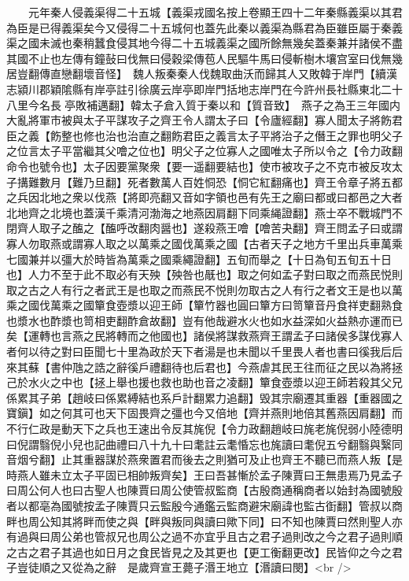 　　元年秦人侵義渠得二十五城【義渠戎國名按上卷顯王四十二年秦縣義渠以其君為臣是已得義渠矣今又侵得二十五城何也蓋先此秦以義渠為縣君為臣雖臣屬于秦義渠之國未滅也秦稍蠶食侵其地今得二十五城義渠之國所餘無幾矣蓋秦兼并諸侯不盡其國不止也左傳有鐘鼔曰伐無曰侵穀梁傳苞人民驅牛馬曰侵斬樹木壤宫室曰伐無幾居豈翻傳直戀翻壞音怪】　魏人叛秦秦人伐魏取曲沃而歸其人又敗韓于岸門【續漢志潁川郡穎隂縣有岸亭註引徐廣云岸亭即岸門括地志岸門在今許州長社縣東北二十八里今名長亭敗補邁翻】韓太子倉入質于秦以和【質音致】　燕子之為王三年國内大亂將軍市被與太子平謀攻子之齊王令人謂太子曰【令廬經翻】寡人聞太子將飭君臣之義【飭整也修也治也治直之翻飭君臣之義言太子平將治子之僭王之罪也明父子之位言太子平當繼其父噲之位也】明父子之位寡人之國唯太子所以令之【令力政翻命令也號令也】太子因要黨聚衆【要一遥翻要結也】使市被攻子之不克市被反攻太子搆難數月【難乃旦翻】死者數萬人百姓恫恐【恫它紅翻痛也】齊王令章子將五都之兵因北地之衆以伐燕【將即亮翻又音如字領也邑有先王之廟曰都或曰都邑之大者北地齊之北境也蓋漢千乘清河渤海之地燕因肩翻下同乘䋲證翻】燕士卒不戰城門不閉齊人取子之醢之【醢呼改翻肉醤也】遂殺燕王噲【噲苦夬翻】齊王問孟子曰或謂寡人勿取燕或謂寡人取之以萬乘之國伐萬乘之國【古者天子之地方千里出兵車萬乘七國兼并以彊大於時皆為萬乘之國乘繩證翻】五旬而舉之【十日為旬五旬五十日也】人力不至于此不取必有天殃【殃咎也旤也】取之何如孟子對曰取之而燕民悦則取之古之人有行之者武王是也取之而燕民不悦則勿取古之人有行之者文王是也以萬乘之國伐萬乘之國簞食壺漿以迎王師【簞竹器也圓曰簞方曰笥簞音丹食祥吏翻熟食也漿水也酢漿也笥相吏翻酢倉故翻】豈有他哉避水火也如水益深如火益熱亦運而已矣【運轉也言燕之民將轉而之他國也】諸侯將謀救燕齊王謂孟子曰諸侯多謀伐寡人者何以待之對曰臣聞七十里為政於天下者湯是也未聞以千里畏人者也書曰徯我后后來其蘇【書仲虺之誥之辭徯戶禮翻待也后君也】今燕虐其民王往而征之民以為將拯己於水火之中也【拯上舉也援也救也助也音之凌翻】簞食壺漿以迎王師若殺其父兄係累其子弟【趙岐曰係累縛結也系戶計翻累力追翻】毁其宗廟遷其重器【重器國之寶鎭】如之何其可也天下固畏齊之彊也今又倍地【齊并燕則地倍其舊燕因肩翻】而不行仁政是動天下之兵也王速出令反其旄倪【令力政翻趙岐曰旄老旄倪弱小陸德明曰倪謂翳倪小兒也記曲禮曰八十九十曰耄註云耄惛忘也旄讀曰耄倪五兮翻翳與繄同音烟兮翻】止其重器謀於燕衆置君而後去之則猶可及止也齊王不聽已而燕人叛【是時燕人雖未立太子平固已相帥叛齊矣】王曰吾甚慚於孟子陳賈曰王無患焉乃見孟子曰周公何人也曰古聖人也陳賈曰周公使管叔監商【古殷商通稱商者以始封為國號殷者以都亳為國號按孟子陳賈只云監殷今通鑑云監商避宋廟諱也監古衘翻】管叔以商畔也周公知其將畔而使之與【畔與叛同與讀曰歟下同】曰不知也陳賈曰然則聖人亦有過與曰周公弟也管叔兄也周公之過不亦宜乎且古之君子過則改之今之君子過則順之古之君子其過也如日月之食民皆見之及其更也【更工衡翻更改】民皆仰之今之君子豈徒順之又從為之辭　是歲齊宣王薨子湣王地立【湣讀曰閔】<br />
